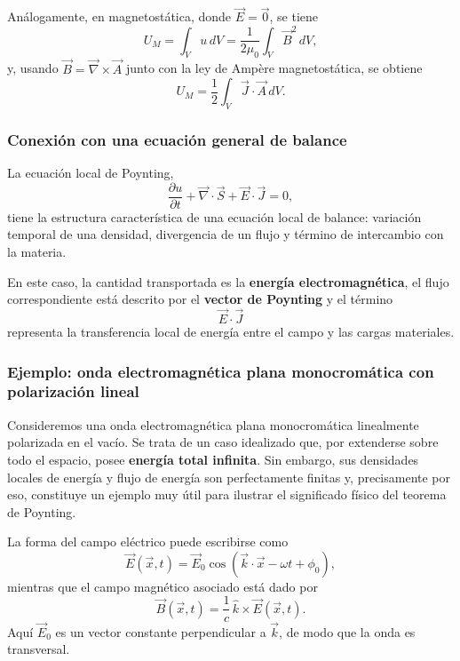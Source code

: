 \documentclass[12pt,a4paper]{article}
\theoremstyle{definition}
\theoremstyle{plain}
\numberwithin{equation}{section}
\theoremstyle{remark}
\newcommand{\E}{\vec{E}}
\newcommand{\B}{\vec{B}}
\newcommand{\J}{\vec{J}}
\newcommand{\A}{\vec{A}}
\begin{document}
Análogamente, en magnetostática, donde $\E=\vec 0$, se tiene
\begin{equation*}
    U_M=\int_V u\,dV=\frac{1}{2\mu_0}\int_V \B^2\,dV,
\end{equation*}
y, usando $\B=\vec\nabla\times\A$ junto con la ley de Ampère magnetostática, se obtiene
\begin{equation*}
    U_M=\frac{1}{2}\int_V \J\cdot\A\,dV.
\end{equation*}

\subsubsection*{Conexión con una ecuación general de balance}

La ecuación local de Poynting,
\begin{equation*}
    \frac{\partial u}{\partial t}
    +
    \vec\nabla\cdot\vec S
    +
    \E\cdot\J
    =0,
\end{equation*}
tiene la estructura característica de una ecuación local de balance: variación temporal de una densidad, divergencia de un flujo y término de intercambio con la materia.

En este caso, la cantidad transportada es la \textbf{energía electromagnética}, el flujo correspondiente está descrito por el \textbf{vector de Poynting} y el término
\begin{equation*}
    \E\cdot\J
\end{equation*}
representa la transferencia local de energía entre el campo y las cargas materiales.


\subsubsection{Ejemplo: onda electromagnética plana monocromática con polarización lineal}

Consideremos una onda electromagnética plana monocromática linealmente polarizada en el vacío. Se trata de un caso idealizado que, por extenderse sobre todo el espacio, posee \textbf{energía total infinita}. Sin embargo, sus densidades locales de energía y flujo de energía son perfectamente finitas y, precisamente por eso, constituye un ejemplo muy útil para ilustrar el significado físico del teorema de Poynting.

La forma del campo eléctrico puede escribirse como
\begin{equation}
    \E(\vec x,t)=\vec E_0\cos\!\left(\vec k\cdot\vec x-\omega t+\phi_0\right),
    \label{eq:onda-plana-E}
\end{equation}
mientras que el campo magnético asociado está dado por
\begin{equation}
    \B(\vec x,t)=\frac{1}{c}\,\hat k\times \E(\vec x,t).
    \label{eq:onda-plana-B}
\end{equation}
Aquí \(\vec E_0\) es un vector constante perpendicular a \(\vec k\), de modo que la onda es transversal.
\end{document}
